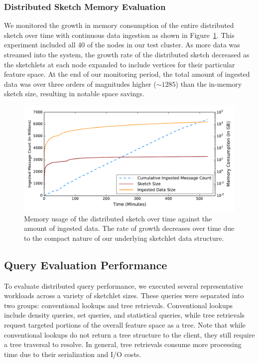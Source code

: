 \subsubsection{Distributed Sketch Memory Evaluation}
We monitored the growth in memory consumption of the entire distributed sketch over time with continuous data ingestion as shown in Figure~\ref{fig:dist-sketch-mem-usage}. This experiment included all 40 of the nodes in our test cluster.  As more data was streamed into the system, the growth rate of the distributed sketch decreased as the sketchlets at each node expanded to include vertices for their particular feature space.  At the end of our monitoring period, the total amount of ingested data was over three orders of magnitudes higher ($\sim 1285$) than the in-memory sketch size, resulting in notable space savings.
%
\begin{figure}[b!]
    \centerline{\includegraphics[width=\linewidth]{figures/ing-and-mem-usage.pdf}}
    \caption{Memory usage of the distributed sketch over time against the amount of ingested data. The rate of growth decreases over time due to the compact nature of our underlying sketchlet data structure.}
    \label{fig:dist-sketch-mem-usage}
\end{figure}
%
\subsection{Query Evaluation Performance}
To evaluate distributed query performance, we executed several representative workloads across a variety of sketchlet sizes. These queries were separated into two groups: conventional lookups and tree retrievals. Conventional lookups include density queries, set queries, and statistical queries, while tree retrievals request targeted portions of the overall feature space as a tree.  Note that while conventional lookups do not return a tree structure to the client, they still require a tree traversal to resolve. In general, tree retrievals consume more processing time due to their serialization and I/O costs.

